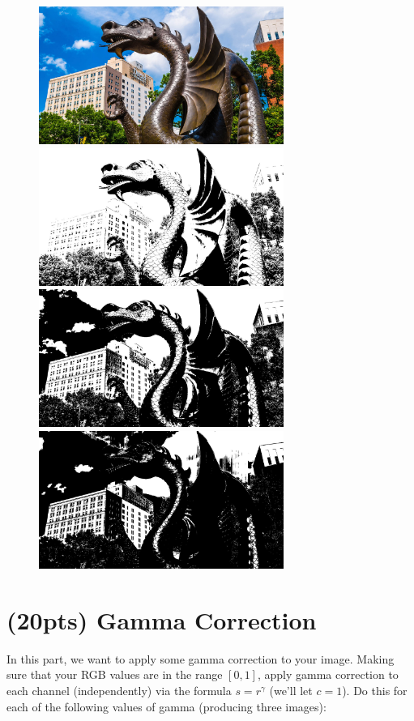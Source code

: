 \documentclass[12pt]{article}
\begin{document}
\begin{figure}[htp]
    \centering
    \includegraphics[width=8cm]{input_1.jpg}
    \includegraphics[width=8cm]{binary_25_t.jpg}
    \includegraphics[width=8cm]{binary_50_t.jpg}
    \includegraphics[width=8cm]{binary_75_t.jpg}
\end{figure}

\newpage
\section{(20pts) Gamma Correction}
In this part, we want to apply some gamma correction to your image.  Making sure that your RGB values are in the range $[0,1]$, apply gamma correction to each channel (independently) via the formula $s=r^\gamma$ (we'll let $c=1$).  Do this for each of the following values of gamma (producing three images):
\end{document}
